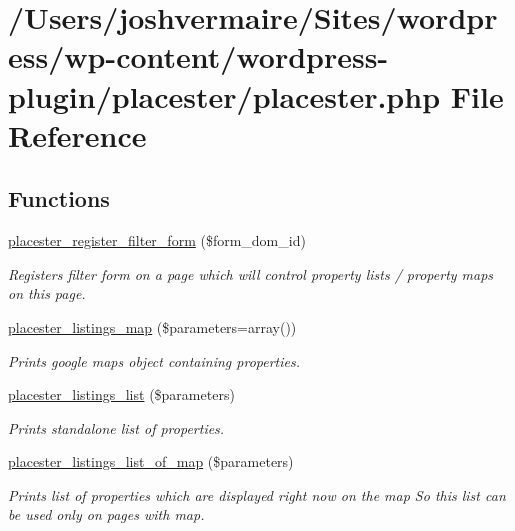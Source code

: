 \hypertarget{placester_8php}{
\section{/Users/joshvermaire/Sites/wordpress/wp-\/content/wordpress-\/plugin/placester/placester.php File Reference}
\label{d1/dce/placester_8php}
}
\subsection*{Functions}
\begin{DoxyCompactItemize}
\item 
\hyperlink{placester_8php_aaa8c780df65fb8fb7ad39d7425e1e4ef}{placester\_\-register\_\-filter\_\-form} (\$form\_\-dom\_\-id)
\begin{DoxyCompactList}\small\item\em Registers filter form on a page which will control property lists / property maps on this page. \end{DoxyCompactList}\item 
\hyperlink{placester_8php_aee21f466b87c75f5b23a551bea39d0d9}{placester\_\-listings\_\-map} (\$parameters=array())
\begin{DoxyCompactList}\small\item\em Prints google maps object containing properties. \end{DoxyCompactList}\item 
\hyperlink{placester_8php_a61607d3fcf834826fba670e91e603e99}{placester\_\-listings\_\-list} (\$parameters)
\begin{DoxyCompactList}\small\item\em Prints standalone list of properties. \end{DoxyCompactList}\item 
\hyperlink{placester_8php_af1e56404742272b311a0332012dd4307}{placester\_\-listings\_\-list\_\-of\_\-map} (\$parameters)
\begin{DoxyCompactList}\small\item\em Prints list of properties which are displayed right now on the map So this list can be used only on pages with map. \end{DoxyCompactList}\end{DoxyCompactItemize}


